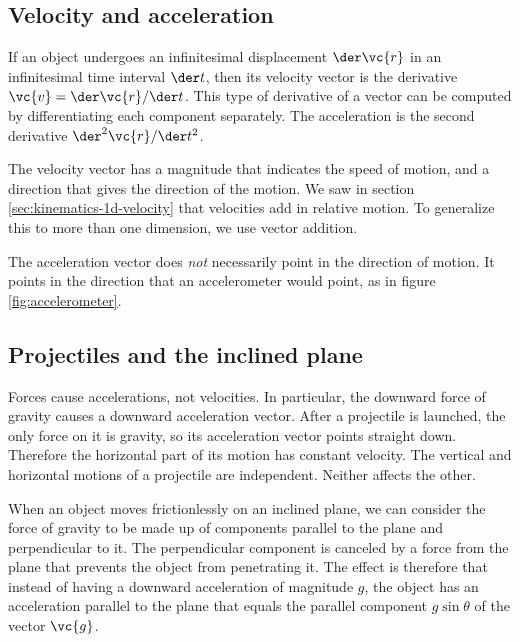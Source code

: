 \subsection{Velocity and acceleration}
If an object undergoes an infinitesimal displacement $\der\vc{r}$ in an
infinitesimal time interval $\der t$, then its velocity vector is the derivative
$\vc{v}=\der\vc{r}/\der t$. This type of derivative of a vector can be computed
by differentiating each component separately. The acceleration is the
second derivative $\der^2\vc{r}/\der t^2$.



The velocity vector has a magnitude that indicates the speed of motion, and
a direction that gives the direction of the motion. We saw in section
\ref{sec:kinematics-1d-velocity} that velocities add in relative motion.
To generalize this to more than one dimension, we use vector addition.

The acceleration vector does \emph{not} necessarily point in the direction
of motion. It points in the direction that an accelerometer would point,
as in figure \ref{fig:accelerometer}.


\subsection{Projectiles and the inclined plane}

Forces cause accelerations, not velocities. In particular, the downward force of gravity
causes a downward acceleration vector. After a projectile
is launched, the only force
on it is gravity, so its acceleration vector points straight down. Therefore the horizontal
part of its motion has constant velocity. The vertical and horizontal motions of a projectile
are independent. Neither affects the other.

When an object moves frictionlessly on an inclined plane, we can consider the force of gravity
to be made up of components parallel to the plane and perpendicular to it. The perpendicular
component is canceled by a force from the plane that prevents the object from penetrating it.
The effect is therefore that instead of having a downward acceleration of magnitude $g$, the
object has an acceleration parallel to the plane that equals the parallel component $g\sin\theta$ of
the vector $\vc{g}$.
